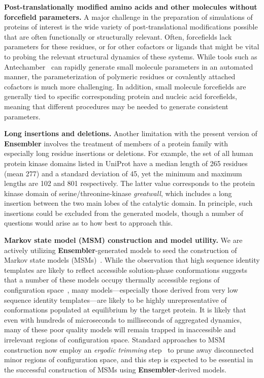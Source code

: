 \documentclass[aps,prl,preprint,nofootinbib,superscriptaddress,linenumbers]{revtex4-1}
\begin{document}
{\bf Post-translationally modified amino acids and other molecules without forcefield parameters.}
A major challenge in the preparation of simulations of proteins of interest is the wide variety of post-translational modifications possible that are often functionally or structurally relevant.
Often, forcefields lack parameters for these residues, or for other cofactors or ligands that might be vital to probing the relevant structural dynamics of these systems.
While tools such as Antechamber~\cite{gaff,gaff2} can rapidly generate small molecule parameters in an automated manner, the parameterization of polymeric residues or covalently attached cofactors is much more challenging.
In addition, small molecule forcefields are generally tied to specific corresponding protein and nucleic acid forcefields, meaning that different procedures may be needed to generate consistent parameters.

{\bf Long insertions and deletions.}
Another limitation with the present version of {\bf Ensembler} involves the treatment of members of a protein family with especially long residue insertions or deletions.
For example, the set of all human protein kinase domains listed in UniProt have a median length of 265 residues (mean 277) and a standard deviation of 45, yet the minimum and maximum lengths are 102 and 801 respectively.
The latter value corresponds to the protein kinase domain of serine/threonine-kinase \emph{greatwall}, which includes a long insertion between the two main lobes of the catalytic domain.
In principle, such insertions could be excluded from the generated models, though a number of questions would arise as to how best to approach this.

{\bf Markov state model (MSM) construction and model utility.}
We are actively utilizing {\bf Ensembler}-generated models to seed the construction of Markov state models (MSMs)~\cite{pande-beauchamp-bowman:2010:methods:markov-model-review,chodera-noe:curr-opin-struct-biol:2014:msm-review}.
While the observation that high sequence identity templates are likely to reflect accessible solution-phase conformations suggests that a number of these models occupy thermally accessible regions of configuration space~\cite{friedland:plos-comput-biol:2009:conformational-dynamics}, many models---especially those derived from very low sequence identity templates---are likely to be highly unrepresentative of conformations populated at equilibrium by the target protein.
It is likely that even with hundreds of microseconds to milliseconds of aggregated dynamics, many of these poor quality models will remain trapped in inaccessible and irrelevant regions of configuration space.
Standard approaches to MSM construction now employ an \emph{ergodic trimming} step~\cite{caflisch:jpcb:2011:msm-subgraph,msmbuilder} to prune away disconnected minor regions of configuration space, and this step is expected to be essential in the successful construction of MSMs using {\bf Ensembler}-derived models.
\end{document}
